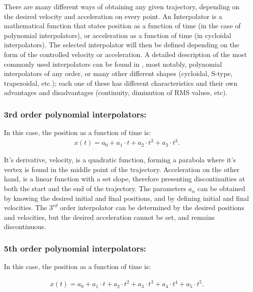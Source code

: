 \documentclass[a4paper]{aadeca}
\begin{document}
There are many different ways of obtaining any given trajectory, depending on the desired velocity and acceleration on every point.
An Interpolator is a mathematical function that states position as a function of time (in the case of polynomial interpolators), or acceleration as a function of time (in cycloidal interpolators).
The selected interpolator will then be defined depending on the form of the controlled velocity or acceleration.
A detailed description of the most commonly used interpolators can be found in \cite{canini_controllo_2003}, most notably, polynomial interpolators of any order, or many other different shapes (cycloidal, S-type, trapezoidal, etc.); each one of these has different characteristics and their own advantages and disadvantages (continuity, diminution of RMS values, etc).

\subsubsection{\textbf{3rd order polynomial interpolators:}}

In this case, the position as a function of time is:
\begin{align}
x(t) = a_0 + a_1 \cdot t + a_2 \cdot t^2 + a_3 \cdot t^3.
\end{align}

It's derivative, velocity, is a quadratic function, forming a parabola where it's vertex is found in the middle point of the trajectory.
Acceleration on the other hand, is a linear function with a set slope, therefore presenting discontinuities at both the start and the end of the trajectory.
The parameters $a_n$ can be obtained by knowing the desired initial and final positions, and by defining initial and final velocities.
The $3^{rd}$ order interpolator can be determined by the desired positions and velocities, but the desired acceleration cannot be set, and remains discontinuous.

\subsubsection{\textbf{5th order polynomial interpolators:}}

In this case, the position as a function of time is:

\small
\begin{align}
x(t) = a_0 + a_1 \cdot t + a_2 \cdot t^2 + a_3 \cdot t^3 + a_4 \cdot t^4 + a_5 \cdot t^5.
\end{align}
\normalsize
\end{document}
